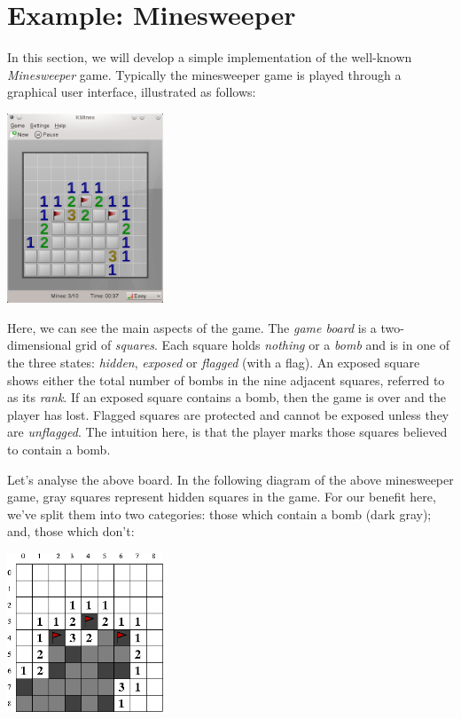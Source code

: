 \newpage
\section{Example: Minesweeper}
In this section, we will develop a simple implementation of the well-known {\em Minesweeper} game.  Typically the minesweeper game is played through a graphical user interface, illustrated as follows:
\begin{center}
\includegraphics[width=0.35\textwidth]{../images/kmines.png}
\end{center}
Here, we can see the main aspects of the game.  The {\em game board} is a two-dimensional grid of {\em squares}.  Each square holds {\em nothing} or a {\em bomb} and is in one of the three states: {\em hidden}, {\em exposed} or {\em flagged} (with a flag).  An exposed square shows either the total number of bombs in the nine adjacent squares, referred to as its {\em rank}.  If an exposed square contains a bomb, then the game is over and the player has lost.  Flagged squares are protected and cannot be exposed unless they are {\em unflagged}.  The intuition here, is that the player marks those squares believed to contain a bomb.  

Let's analyse the above board.  In the following diagram of the above minesweeper game, gray squares represent hidden squares in the game.  For our benefit here, we've split them into two categories: those which contain a bomb (dark gray); and, those which don't: 

\begin{center}
\includegraphics[width=0.35\textwidth]{../images/kmines_analysis.png}
\end{center}

